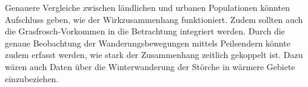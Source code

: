 \documentclass{article}
\begin{document}
Genauere Vergleiche zwischen ländlichen und urbanen Populationen könnten Aufschluss geben, wie der Wirkzusammenhang funktioniert.
Zudem sollten auch die Grasfrosch-Vorkommen in die Betrachtung integriert werden.
Durch die genaue Beobachtung der Wanderungsbewegungen mittels Peilsendern könnte zudem erfasst werden, wie stark der Zusammenhang zeitlich gekoppelt ist.
Dazu wären auch Daten über die Winterwanderung der Störche in wärmere Gebiete einzubeziehen.





\printbibliography
\end{document}
